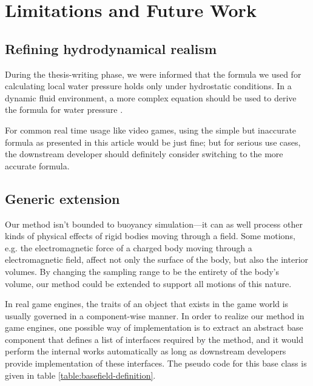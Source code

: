 \section{Limitations and Future Work}

\subsection{Refining hydrodynamical realism}

During the thesis-writing phase, we were informed that the formula we used for calculating local water pressure holds only under hydrostatic conditions.
In a dynamic fluid environment, a more complex equation should be used to derive the formula for water pressure \cite{national2003fundamentals}.

For common real time usage like video games, using the simple but inaccurate formula as presented in this article would be just fine; but for serious use cases, the downstream developer should definitely consider switching to the more accurate formula.

\subsection{Generic extension}

Our method isn't bounded to buoyancy simulation---it can as well process other kinds of physical effects of rigid bodies moving through a field.
Some motions, e.g. the electromagnetic force of a charged body moving through a electromagnetic field, affect not only the surface of the body, but also the interior volumes.
By changing the sampling range to be the entirety of the body's volume, our method could be extended to support all motions of this nature.

In real game engines, the traits of an object that exists in the game world is usually governed in a component-wise manner.
In order to realize our method in game engines, one possible way of implementation is to extract an abstract base component that defines a list of interfaces required by the method, and it would perform the internal works automatically as long as downstream developers provide implementation of these interfaces.
The pseudo code for this base class is given in table \ref{table:basefield-definition}.

